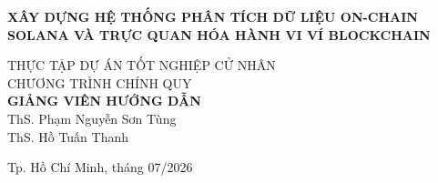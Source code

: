 \begin{titlepage}
\begin{center}

{ \Large \bfseries XÂY DỰNG HỆ THỐNG PHÂN TÍCH DỮ
LIỆU ON-CHAIN SOLANA VÀ TRỰC QUAN
HÓA HÀNH VI VÍ BLOCKCHAIN \\[2cm]}  


\large THỰC TẬP DỰ ÁN TỐT NGHIỆP CỬ NHÂN\\
\large CHƯƠNG TRÌNH CHÍNH QUY\\[1.8cm]

\textbf{GIẢNG VIÊN HƯỚNG DẪN}\\
ThS. Phạm Nguyễn Sơn Tùng\\
ThS. Hồ Tuấn Thanh\\



\vfill
Tp. Hồ Chí Minh, tháng 07/2026

\end{center}

\end{titlepage}